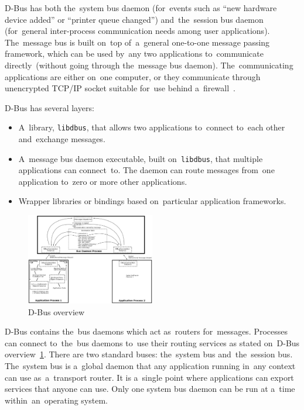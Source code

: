 \documentclass[conference]{IEEEtran}
\begin{document}
D-Bus has both the~system bus daemon (for~events such as ``new hardware device
added'' or ``printer queue changed'') and~the~session bus daemon (for~general
inter-process communication needs among user \mbox{applications}). The~message bus
is built on~top of~a~general one-to-one message passing framework, which can be
used by~any two applications to~communicate directly~(without going through
the~message bus daemon). The~communicating applications are either on~one computer,
or they communicate through unencrypted TCP/IP socket suitable for~use behind
a~firewall~\cite{DBUS}.

D-Bus has several layers:
\begin{itemize}
	\item A~library, \texttt{libdbus}, that allows two applications to~connect
		to~each other and~exchange messages.
	\item A~message bus daemon executable, built on~\texttt{libdbus},
		that multiple applications can connect~to. The daemon can route messages
		from~one application to~zero or more other applications.
	\item Wrapper libraries or bindings based on~particular application frameworks.
\end{itemize}


\begin{figure}[h]
\centering
\caption{D-Bus overview~\cite{DBUS}}
\label{fig:dbus_image}
\includegraphics[width=0.5\textwidth]{dbus_diagram.eps}
\end{figure}


D-Bus contains the~bus daemons which act as~routers for~messages. Processes
can connect to~the~bus daemons to~use their routing services as stated on~D-Bus
overview~\ref{fig:dbus_image}. There are two standard buses: the~system bus
and~the~session bus.\\

The~system bus is a~global daemon that any application running in~any
context can use as~a~transport router. It is a~single point where applications
can export services that anyone can use. Only one system bus daemon
can be run at a~time within~an~operating system.\\
\end{document}
